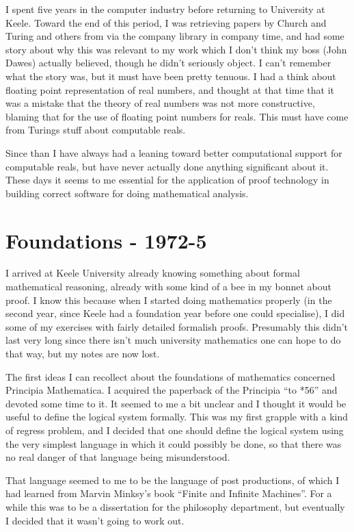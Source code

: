 \documentclass[10pt,titlepage]{book}
\begin{document}
I spent five years in the computer industry before returning to University at Keele.
Toward the end of this period, I was retrieving papers by Church and Turing and others from via the company library in company time, and had some story about why this was relevant to my work which I don't think my boss (John Dawes) actually believed, though he didn't seriously object.
I can't remember what the story was, but it must have been pretty tenuous.
I had a think about floating point representation of real numbers, and thought at that time that it was a mistake that the theory of real numbers was not more constructive, blaming that for the use of floating point numbers for reals.
This must have come from Turings stuff about computable reals.

Since than I have always had a leaning toward better computational support for computable reals, but have never actually done anything significant about it.
These days it seems to me essential for the application of proof technology in building correct software for doing mathematical analysis.

\section{Foundations - 1972-5}

I arrived at Keele University already knowing something about formal mathematical reasoning, already with some kind of a bee in my bonnet about proof.
I know this because when I started doing mathematics properly (in the second year, since Keele had a foundation year before one could specialise), I did some of my exercises with fairly detailed formalish proofs.
Presumably this didn't last very long since there isn't much university mathematics one can hope to do that way, but my notes are now lost.

The first ideas I can recollect about the foundations of mathematics concerned Principia Mathematica.
I acquired the paperback of the Principia ``to *56'' and devoted some time to it.
It seemed to me a bit unclear and I thought it would be useful to define the logical system formally.
This was my first grapple with a kind of regress problem, and I decided that one should define the logical system using the very simplest language in which it could possibly be done, so that there was no real danger of that language being misunderstood.

That language seemed to me to be the language of post productions, of which I had learned from Marvin Minksy's book ``Finite and Infinite Machines''.
For a while this was to be a dissertation for the philosophy department, but eventually I decided that it wasn't going to work out.
\end{document}
